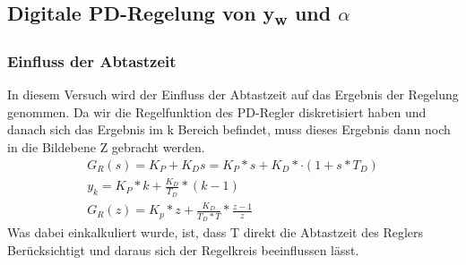 \documentclass[10pt]{scrartcl}
\begin{document}
\subsection{Digitale PD-Regelung von  y\textsubscript{w} und $\alpha$}
\subsubsection{Einfluss der Abtastzeit}

In diesem Versuch wird der Einfluss der Abtastzeit auf das Ergebnis der Regelung genommen. Da wir die Regelfunktion des PD-Regler diskretisiert haben und danach sich das Ergebnis im k Bereich befindet, muss dieses Ergebnis dann noch in die Bildebene Z gebracht werden. 
\begin{align}
   G_R(s) = K_P + K_D s = K_P *s + K_D *·(1 + s *T_D)  \\
   y_k= K_P * k+ \frac{K_D}{T_D} *( k - 1 )  \\
   G_R(z) = K_p * z + \frac{K_D}{T_D*T} *\frac{z-1}{z}
\end{align}
Was dabei einkalkuliert wurde, ist, dass T direkt die Abtastzeit des Reglers Berücksichtigt und daraus sich der Regelkreis beeinflussen lässt.
\end{document}
